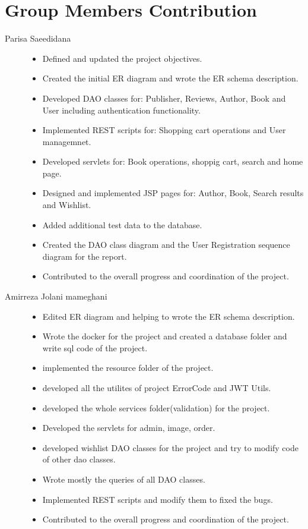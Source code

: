 \section{Group Members Contribution}


\begin{description}
	\item[Parisa Saeedidana]
	    \begin{itemize}
		\item Defined and updated the project objectives.
		\item Created the initial ER diagram and wrote the ER schema description.
		\item Developed DAO classes for: Publisher, Reviews, Author, Book and User including authentication functionality.
		\item Implemented REST scripts for: Shopping cart operations and User managemnet.
		\item Developed servlets for: Book operations, shoppig cart, search and home page.
		\item Designed and implemented JSP pages for: Author, Book, Search results and Wishlist.
		\item Added additional test data to the database.
		\item Created the DAO class diagram and the User Registration sequence diagram for the report.
		\item Contributed to the overall progress and coordination of the project.
		\end{itemize}

	\item[Amirreza Jolani mameghani] 	    
	\begin{itemize}
		\item Edited ER diagram and helping to wrote the ER schema description.
		\item Wrote the docker for the project and created a database folder and write sql code of the project.
		\item implemented the resource folder of the project.
		\item developed all the utilites of project ErrorCode and JWT Utils.
		\item developed the whole services folder(validation) for the project.
		\item Developed the servlets for admin, image, order.
		\item developed wishlist DAO classes for the project and try to modify code of other dao classes.
		\item Wrote mostly the queries of all DAO classes.
		\item Implemented REST scripts and modify them to fixed the bugs.
		\item Contributed to the overall progress and coordination of the project.
	\end{itemize}


\end{description}
